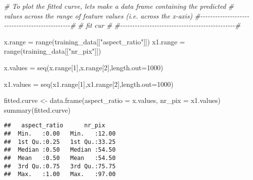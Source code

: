 \documentclass[
]{article}
\newenvironment{Shaded}{\begin{snugshade}}{\end{snugshade}}
\newcommand{\AttributeTok}[1]{\textcolor[rgb]{0.77,0.63,0.00}{#1}}
\newcommand{\CommentTok}[1]{\textcolor[rgb]{0.56,0.35,0.01}{\textit{#1}}}
\newcommand{\DecValTok}[1]{\textcolor[rgb]{0.00,0.00,0.81}{#1}}
\newcommand{\FunctionTok}[1]{\textcolor[rgb]{0.00,0.00,0.00}{#1}}
\newcommand{\NormalTok}[1]{#1}
\newcommand{\OtherTok}[1]{\textcolor[rgb]{0.56,0.35,0.01}{#1}}
\newcommand{\StringTok}[1]{\textcolor[rgb]{0.31,0.60,0.02}{#1}}
\begin{document}
\begin{Shaded}
\begin{Highlighting}[]
\CommentTok{\# To plot the fitted curve, let\textquotesingle{}s make a data frame containing the predicted }
\CommentTok{\# values across the range of feature values (i.e. across the x{-}axis)}
\CommentTok{\#{-}{-}{-}{-}{-}{-}{-}{-}{-}{-}{-}{-}{-}{-}{-}{-}{-}{-}{-}{-}{-}{-}{-}{-}{-}{-}{-}{-}{-}{-}{-}{-}{-}{-}{-}{-}{-}{-}{-}{-}{-}{-}{-}{-}{-}{-}{-}\#}
\CommentTok{\#             fit cur                           \#}
\CommentTok{\#{-}{-}{-}{-}{-}{-}{-}{-}{-}{-}{-}{-}{-}{-}{-}{-}{-}{-}{-}{-}{-}{-}{-}{-}{-}{-}{-}{-}{-}{-}{-}{-}{-}{-}{-}{-}{-}{-}{-}{-}{-}{-}{-}{-}{-}{-}{-}\#}

\NormalTok{x.range }\OtherTok{=} \FunctionTok{range}\NormalTok{(training\_data[[}\StringTok{"aspect\_ratio"}\NormalTok{]])}
\NormalTok{x1.range }\OtherTok{=} \FunctionTok{range}\NormalTok{(training\_data[[}\StringTok{"nr\_pix"}\NormalTok{]])}

\NormalTok{x.values }\OtherTok{=} \FunctionTok{seq}\NormalTok{(x.range[}\DecValTok{1}\NormalTok{],x.range[}\DecValTok{2}\NormalTok{],}\AttributeTok{length.out=}\DecValTok{1000}\NormalTok{)}

\NormalTok{x1.values }\OtherTok{=} \FunctionTok{seq}\NormalTok{(x1.range[}\DecValTok{1}\NormalTok{],x1.range[}\DecValTok{2}\NormalTok{],}\AttributeTok{length.out=}\DecValTok{1000}\NormalTok{)}


\NormalTok{fitted.curve }\OtherTok{\textless{}{-}} \FunctionTok{data.frame}\NormalTok{(}\AttributeTok{aspect\_ratio =}\NormalTok{ x.values, }\AttributeTok{nr\_pix =}\NormalTok{ x1.values)}
\FunctionTok{summary}\NormalTok{(fitted.curve)}
\end{Highlighting}
\end{Shaded}

\begin{verbatim}
##   aspect_ratio      nr_pix     
##  Min.   :0.00   Min.   :12.00  
##  1st Qu.:0.25   1st Qu.:33.25  
##  Median :0.50   Median :54.50  
##  Mean   :0.50   Mean   :54.50  
##  3rd Qu.:0.75   3rd Qu.:75.75  
##  Max.   :1.00   Max.   :97.00
\end{verbatim}
\end{document}
